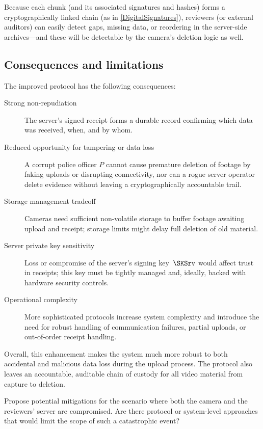 Because each chunk (and its associated signatures and hashes) forms a
cryptographically linked chain (as in \cref{DigitalSignatures}), reviewers
(or external auditors) can easily detect gaps, missing data, or reordering
in the server-side archives---and these will be detectable by the camera's
deletion logic as well.

\subsection{Consequences and limitations}

The improved protocol has the following consequences:

\begin{description}
  \item[Strong non-repudiation] The server's signed receipt forms a
    durable record confirming which data was received, when, and by whom.
  \item[Reduced opportunity for tampering or data loss] A corrupt police
    officer \(P\) cannot cause premature deletion of footage by faking
    uploads or disrupting connectivity, nor can a rogue server operator
    delete evidence without leaving a cryptographically accountable trail.
  \item[Storage management tradeoff] Cameras need sufficient non-volatile
    storage to buffer footage awaiting upload and receipt; storage limits
    might delay full deletion of old material.
  \item[Server private key sensitivity] Loss or compromise of the server's
    signing key~\(\SKSrv\) would affect trust in receipts; this key must be
    tightly managed and, ideally, backed with hardware security controls.
  \item[Operational complexity] More sophisticated protocols increase
    system complexity and introduce the need for robust handling of
    communication failures, partial uploads, or out-of-order receipt
    handling.
\end{description}

Overall, this enhancement makes the system much more robust to both
accidental and malicious data loss during the upload process.
The protocol also leaves an accountable, auditable chain of custody for all
video material from capture to deletion.

\begin{exercise}
  Propose potential mitigations for the scenario where both the camera and the 
  reviewers' server are compromised. Are there protocol or system-level 
  approaches that would limit the scope of such a catastrophic event?
\end{exercise}


